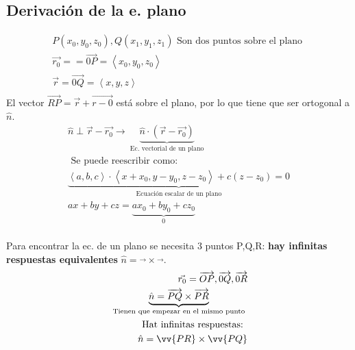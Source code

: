 \documentclass{article}
\begin{document}
\subsection{Derivación de la e. plano}
\begin{align*}
    P(x_0,y_0,z_0), Q(x_1,y_1,z_1) \text{  Son dos puntos sobre el plano  } \\ 
    \vec{r_0} = = \overrightarrow{0P} = \left\langle x_0,y_0,z_0 \right\rangle \\ 
    \vec{r} = \overrightarrow{0Q} = \left\langle x,y,z \right\rangle \\ 
\end{align*}
El vector $\vec{RP} = \vec{r} + \vec{r-0}$ está sobre el plano, por lo que tiene que ser ortogonal a $\hat{n}$.
 \begin{align*}
     \hat{n} \perp \vec{r}- \vec{r_0} \rightarrow \underbrace{\hat{n}\cdot (\vec{r}-\vec{r_0})}_{\text{  Ec. vectorial de un plano  }} \\ 
    \text{  Se puede reescribir como:  } \\ 
     \underbrace{\left\langle a,b,c \right\rangle \cdot \left\langle x+x_0,y-y_0,z-z_0 \right\rangle + c(z-z_0) = 0 }_{\text{  Ecuación escalar de un plano  }} \\ 
     ax+by+cz = \underbrace{ax_0+by_0+cz_0}_{0} \\ 
 \end{align*}

Para encontrar la ec. de un plano se necesita 3 puntos P,Q,R: \textbf{hay infinitas respuestas equivalentes } $\hat{n}=\vec{}\times \vec{}$.
\begin{align*}
    \vec{r_0} = \overrightarrow{OP}, \overrightarrow{0Q}, \overrightarrow{0R} \\ 
    \underbrace{\hat{n} = \overrightarrow{PQ} \times \overrightarrow{PR}}_{\text{  Tienen que empezar en el mismo punto  }} \\ 
    \text{  Hat infinitas respuestas:  } \\ 
    \hat{n} = \vv{PR} \times \vv{PQ} \\ 
\end{align*}
\end{document}
